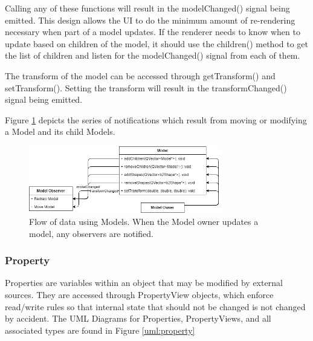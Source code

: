  Calling any of these functions will result in the modelChanged() signal being emitted. This design allows the UI to do the minimum amount of re-rendering necessary when part of a model updates. If the renderer needs to know when to update based on children of the model, it should use the children() method to get the list of children and listen for the modelChanged() signal from each of them.
 
 The transform of the model can be accessed through getTransform() and setTransform(). Setting the transform will result in the transformChanged() signal being emitted.
 
 Figure \ref{uml:dataflow_model} depicts the series of notifications which result from moving or modifying a Model and its child Models.
 \begin{figure}[h]
 	\begin{center}
 	\includegraphics[width=0.75\textwidth]{./images_design/uml/DataFlow_Model}
 	\caption{Flow of data using Models. When the Model owner updates a model, any observers are notified. \label{uml:dataflow_model}}
 	\end{center}
 \end{figure}   
 
 \subsubsection*{Property}
 	Properties are variables within an object that may be modified by external sources. They are accessed through PropertyView objects, which enforce read/write rules so that internal state that should not be changed is not changed by accident. The UML Diagrams for Properties, PropertyViews, and all associated types are found in Figure \ref{uml:property}
 	
